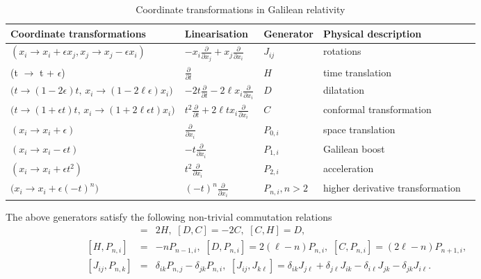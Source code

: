 \documentclass[12pt]{article}
\begin{document}
\begin{table}[htbp]
\centering
\caption{Coordinate transformations  in Galilean relativity}
{\small
    \begin{tabular}{| p{5.4cm} |p{2.68cm} | p{1.75cm}|p{4.45cm} |p{1cm} |}
 \hline
 Coordinate transformations& Linearisation & Generator &Physical description \\
 \hline 
$(x_i \to x_i + \epsilon x_j , x_j \to x_j - \epsilon x_i )$ & $-x_i \frac{\partial}{\partial x_j}+x_j \frac{\partial}{\partial x_i}$   & $J_{ij}$ &rotations\\
\hline 
(t $\to$ t + $\epsilon$) & $\frac{\partial}{\partial t}$ & $H$ & time  translation \\
\hline 
$\Big(t \to (1 - 2\epsilon)t, \,  x_i \to (1 - 2\ell \epsilon)x_i \Big)$ &$-2t\frac{\partial}{\partial t}-2 \ell x_i \frac{\partial}{\partial x_{i}}$ & $D$ &dilatation\\
\hline
$\Big(t \to (1 + \epsilon t)t, \,  x_i \to (1 + 2\ell \epsilon t)x_i \Big)$   &$t^2\frac{\partial}{\partial t} +2 \ell t x_i \frac{\partial}{\partial x_{i}}$ & $C$ &conformal transformation\\
\hline
$ (x_i \to x_i + \epsilon)$ & $ \frac{\partial}{\partial x_{i}}$ & $P_{0,i}$ &space  translation\\
$(x_i \to x_i - \epsilon t)$& $-t\frac{\partial}{\partial x_{i}}$ & $P_{1,i}$ &Galilean  boost \\
$(x_i \to x_i + \epsilon t^2)$ & $  t^2\frac{\partial}{\partial x_{i}}$ & $P_{2,i}$ &acceleration\\
$\Big(x_i \to x_i + \epsilon (-t)^n\Big)$ & $  (-t)^n\frac{\partial}{\partial x_{i}}$  & $P_{n,i}, n > 2 $&higher  derivative  transformation\\
\hline
    \end{tabular}\label{ta1b}
}
\end{table}
 The above generators satisfy the following non-trivial commutation relations 
 \begin{eqnarray}
[D,H]&=& 2H,   \,\,[D,C]= -2C, \,\,[C, H]=D, \,\,\label{CG1}
\qquad\qquad\qquad \\
\,\,[H,P_{n,i}]&=&-nP_ {n-1,i},\,\,[D,P_{n,i}]=2(\ell - n)P_ {n,i}, \,\,[C,P_{n,i}]=(2\ell - n)P_{n+1,i},\label{CG2}
\qquad\qquad\qquad \\
\,\,[J_{ij}, P_{n,k} ]&=&\delta_{ik}P_{n,j} - \delta_{jk}P_{n,i},  \,\,
[J_{ij}, J_{k\ell}] =\delta_{ik}J_{j\ell} + \delta_{j \ell}J_{ik} - \delta_{i \ell}J_{jk} - \delta_{jk}J_{i \ell}. \label{CG3}
\end{eqnarray}
\end{document}
